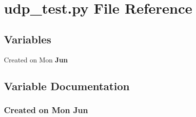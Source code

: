\section{udp\_\-test.py File Reference}
\label{udp__test_8py}
\subsection*{Variables}
\begin{CompactItemize}
\item 
Created on Mon {\bf Jun}
\end{CompactItemize}


\subsection{Variable Documentation}
\subsubsection{\setlength{\rightskip}{0pt plus 5cm}Created on Mon Jun}\label{udp__test_8py_a0}


